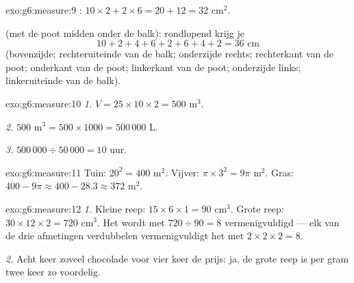\begin{solution}{exo:g6:measure:9}
: $10 \times 2 + 2 \times 6 = 20 + 12 = 32$ cm$^2$.

 (met de poot midden onder de balk): rondlopend krijg je
\[
10 + 2 + 4 + 6 + 2 + 6 + 4 + 2 = 36 \text{ cm}
\]
(bovenzijde; rechteruiteinde van de balk; onderzijde rechts; rechterkant van de
poot; onderkant van de poot; linkerkant van de poot; onderzijde links;
linkeruiteinde van de balk).
\end{solution}

\begin{solution}{exo:g6:measure:10}
\emph{1.} $V = 25 \times 10 \times 2 = 500$ m$^3$.

\emph{2.} $500$ m$^3 = 500 \times 1000 = 500\,000$ L.

\emph{3.} $500\,000 \div 50\,000 = 10$ uur.
\end{solution}

\begin{solution}{exo:g6:measure:11}
Tuin: $20^2 = 400$ m$^2$. Vijver: $\pi \times 3^2 = 9\pi$ m$^2$. Gras:
$400 - 9\pi \approx 400 - 28.3 \approx 372$ m$^2$.
\end{solution}

\begin{solution}{exo:g6:measure:12}
\emph{1.} Kleine reep: $15 \times 6 \times 1 = 90$ cm$^3$. Grote reep:
$30 \times 12 \times 2 = 720$ cm$^3$. Het  wordt met
$720 \div 90 = 8$ vermenigvuldigd --- elk van de drie afmetingen verdubbelen
vermenigvuldigt het  met $2 \times 2 \times 2 = 8$.

\emph{2.} Acht keer zoveel chocolade voor vier keer de prijs: ja, de grote reep
is per gram twee keer zo voordelig.
\end{solution}

